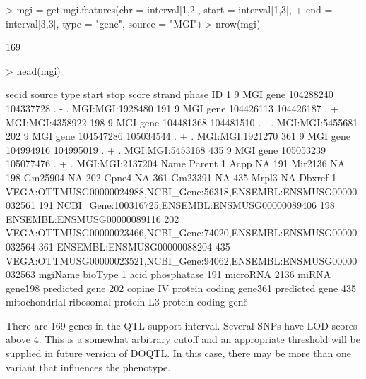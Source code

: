 \documentclass{article}
\begin{document}
\begin{Schunk}
\begin{Sinput}
> mgi = get.mgi.features(chr = interval[1,2], start = interval[1,3],
+       end = interval[3,3], type = "gene", source = "MGI")
> nrow(mgi)
\end{Sinput}
\begin{Soutput}
[1] 169
\end{Soutput}
\begin{Sinput}
> head(mgi)
\end{Sinput}
\begin{Soutput}
    seqid source type     start      stop score strand phase              ID
1       9    MGI gene 104288240 104337728     .      -     . MGI:MGI:1928480
191     9    MGI gene 104426113 104426187     .      +     . MGI:MGI:4358922
198     9    MGI gene 104481368 104481510     .      -     . MGI:MGI:5455681
202     9    MGI gene 104547286 105034544     .      +     . MGI:MGI:1921270
361     9    MGI gene 104994916 104995019     .      +     . MGI:MGI:5453168
435     9    MGI gene 105053239 105077476     .      +     . MGI:MGI:2137204
       Name Parent
1      Acpp     NA
191 Mir2136     NA
198 Gm25904     NA
202   Cpne4     NA
361 Gm23391     NA
435   Mrpl3     NA
                                                                Dbxref
1   VEGA:OTTMUSG00000024988,NCBI_Gene:56318,ENSEMBL:ENSMUSG00000032561
191                     NCBI_Gene:100316725,ENSEMBL:ENSMUSG00000089406
198                                         ENSEMBL:ENSMUSG00000089116
202 VEGA:OTTMUSG00000023466,NCBI_Gene:74020,ENSEMBL:ENSMUSG00000032564
361                                         ENSEMBL:ENSMUSG00000088204
435 VEGA:OTTMUSG00000023521,NCBI_Gene:94062,ENSEMBL:ENSMUSG00000032563
                               mgiName               bioType
1         acid phosphatase%
191                      microRNA 2136          miRNA gene\r
198            predicted gene%
202                          copine IV protein coding gene\r
361            predicted gene%
435 mitochondrial ribosomal protein L3 protein coding gene\r
\end{Soutput}
\end{Schunk}

There are 169 genes in the QTL support interval. Several SNPs have LOD scores above 4. This is a somewhat arbitrary cutoff and an appropriate threshold will be supplied in future version of DOQTL. In this case, there may be more than one variant that influences the phenotype.
\end{document}
